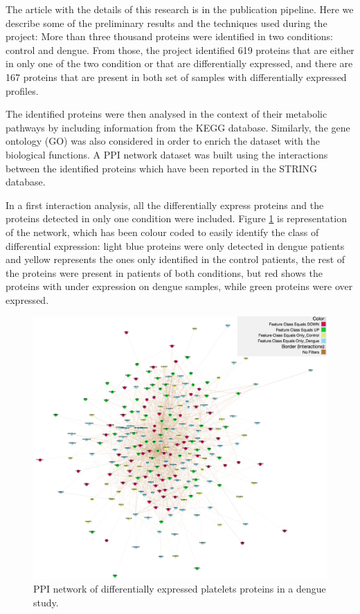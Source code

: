 The article with the details of this research is in the publication pipeline. Here we describe some of the preliminary results and the techniques used during the project: More than three thousand proteins were identified in two conditions: control and dengue. From those, the project identified 619 proteins that are either in only one of the two condition or that are differentially expressed, and there are 167 proteins that are present in both set of samples with differentially expressed profiles.

The identified proteins were then analysed in the context of their metabolic pathways by including information from the KEGG database. Similarly, the gene ontology (GO) was also considered in order to enrich the dataset with the biological functions.  A PPI network dataset was built using the interactions between the identified proteins which have been reported in the STRING database.

In a first interaction analysis, all the differentially express proteins and the proteins detected in only one condition were included. Figure \ref{fig:pinv_platelets_1} is representation of the network, which has been colour coded to easily identify the class of differential expression: light blue proteins were only detected in dengue patients and yellow represents the ones only identified in the control patients, the rest of the proteins were present in patients of both conditions, but red shows the proteins with under expression on dengue samples, while green proteins were over expressed.

\begin{figure}
\centering
\includegraphics[width=\textwidth]{figures/pinv_platelets_1.png}
\caption[PPI network of differentially expressed platelets proteins in a dengue study.]{PPI network of differentially expressed platelets proteins in a dengue study.
\label{fig:pinv_platelets_1}}
\end{figure}

